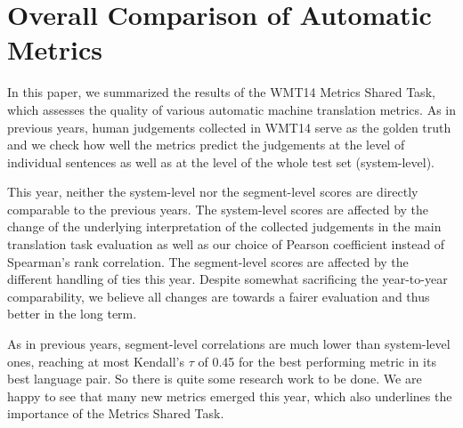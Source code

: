 \section{Overall Comparison of Automatic Metrics}

In this paper, we summarized the results of the WMT14 Metrics Shared Task, which
assesses the quality of
various automatic machine translation metrics. As in previous years, human
judgements collected in WMT14 serve as the golden truth and we check how well
the metrics predict the judgements at the level of individual sentences as well
as at the level of the whole test set (system-level).

This year, neither the system-level nor the segment-level scores are directly
comparable to the previous years. The system-level scores are affected by the
change of the underlying interpretation of the collected judgements in the main
translation task evaluation as well as
our choice of Pearson coefficient instead of Spearman's rank correlation. The
segment-level scores are affected by the different handling of ties this year.
Despite somewhat sacrificing the year-to-year comparability, we believe all
changes are towards a fairer evaluation and thus better in the long term.

As in previous years, segment-level correlations are much lower than
system-level ones, reaching at most Kendall's $\tau$ of 0.45 for the best
performing metric in its best language pair. So there is quite some research
work to be done. We are happy to see that many new metrics emerged this year,
which also underlines the importance of the Metrics Shared Task.


